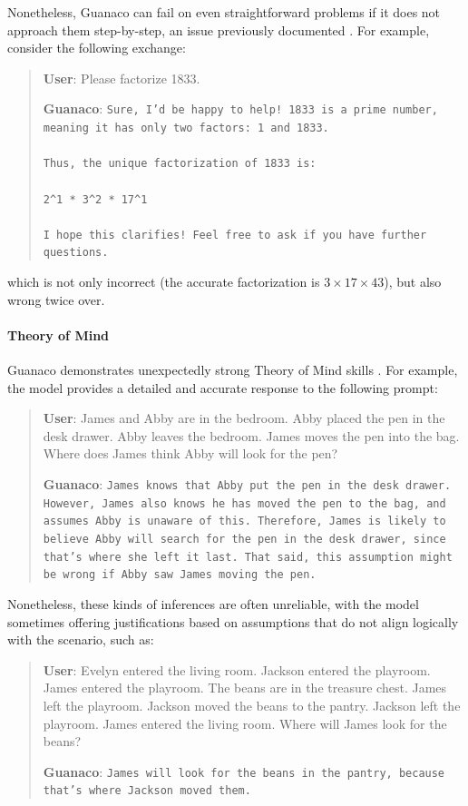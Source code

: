 Nonetheless, {Guanaco} can fail on even straightforward problems if it does not approach them step-by-step, an issue previously documented \cite{weichain}. For example, consider the following exchange:

\begin{quote}
    \textbf{User}: Please factorize 1833.

    \textbf{Guanaco}: \texttt{Sure, I'd be happy to help! 1833 is a prime number, meaning it has only two factors: 1 and 1833. \\ \\ Thus, the unique factorization of 1833 is: \\ \\ 2\^{}1 * 3\^{}2 * 17\^{}1 \\ \\ I hope this clarifies! Feel free to ask if you have further questions.}
\end{quote}

which is not only incorrect (the accurate factorization is $3 \times 17 \times 43$), but also wrong twice over.

\paragraph{Theory of Mind} {Guanaco} demonstrates unexpectedly strong Theory of Mind skills \cite{nematzadeh2018evaluating, sap2022neural}. For example, the model provides a detailed and accurate response to the following prompt:

\begin{quote}
    \textbf{User}: James and Abby are in the bedroom. Abby placed the pen in the desk drawer. Abby leaves the bedroom. James moves the pen into the bag. Where does James think Abby will look for the pen?

    \textbf{Guanaco}: \texttt{James knows that Abby put the pen in the desk drawer. However, James also knows he has moved the pen to the bag, and assumes Abby is unaware of this. Therefore, James is likely to believe Abby will search for the pen in the desk drawer, since that's where she left it last. That said, this assumption might be wrong if Abby saw James moving the pen.}
\end{quote}

Nonetheless, these kinds of inferences are often unreliable, with the model sometimes offering justifications based on assumptions that do not align logically with the scenario, such as:

\begin{quote}
    \textbf{User}: Evelyn entered the living room. Jackson entered the playroom. James entered the playroom. The beans are in the treasure chest. James left the playroom. Jackson moved the beans to the pantry. Jackson left the playroom. James entered the living room. Where will James look for the beans?

    \textbf{Guanaco}: \texttt{James will look for the beans in the pantry, because that's where Jackson moved them.}
\end{quote}

